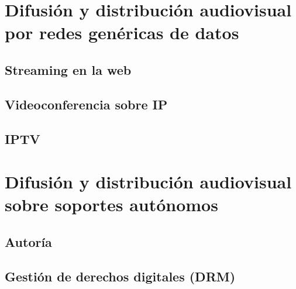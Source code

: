 \documentclass[10pt]{book}
\begin{document}
\chapter{Difusión y distribución audiovisual por redes genéricas de datos}
\section{Streaming en la web}
\section{Videoconferencia sobre IP}
\section{IPTV}

\chapter{Difusión y distribución audiovisual sobre soportes autónomos}
\section{Autoría}
\section{Gestión de derechos digitales (DRM)}
\end{document}
